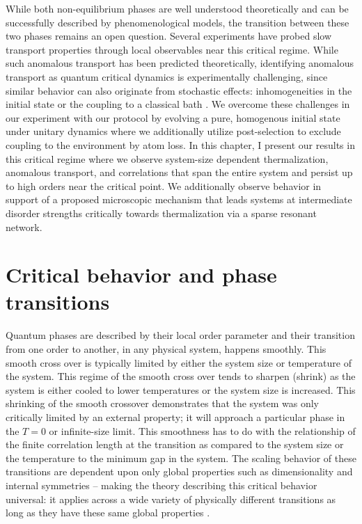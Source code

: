 While both non-equilibrium phases are well understood theoretically and can be successfully described by phenomenological models\cite{Serbyn2013b,Huse2014,Nandkishore2015}, the transition between these two phases remains an open question\cite{Grover2014,Vosk2015,Potter2015,Khemani2017,Alet2018,Abanin2018,Zhang2018}. Several experiments have probed slow transport properties through local observables near this critical regime\cite{Luschen2017,Bordia2017}. While such anomalous transport has been predicted theoretically\cite{Agarwal2015,Setiawan2017,Zhang2018}, identifying anomalous transport as quantum critical dynamics is experimentally challenging, since similar behavior can also originate from stochastic effects: inhomogeneities in the initial state\cite{Luitz2016} or the coupling to a classical bath \cite{Nandkishore2014,Luschen2017b}. We overcome these challenges in our experiment with our protocol by evolving a pure, homogenous initial state under unitary dynamics where we additionally utilize post-selection to exclude coupling to the environment by atom loss\cite{Luschen2017b,Lukin2019}. In this chapter, I present our results in this critical regime where we observe system-size dependent thermalization, anomalous transport, and correlations that span the entire system and persist up to high orders near the critical point\cite{Rispoli2018}. We additionally observe behavior in support of a proposed microscopic mechanism that leads systems at intermediate disorder strengths critically towards thermalization via a sparse resonant network\cite{Potter2015,Khemani2017,Rispoli2018,Herviou2019}. 


\section{Critical behavior and phase transitions}

Quantum phases are described by their local order parameter and their transition from one order to another, in any physical system, happens smoothly. This smooth cross over is typically limited by either the system size or temperature of the system. This regime of the smooth cross over tends to sharpen (shrink) as the system is either cooled to lower temperatures or the system size is increased. This shrinking of the smooth crossover demonstrates that the system was only critically limited by an external property; it will approach a particular phase in the $T=0$ or infinite-size limit. This smoothness has to do with the relationship of the finite correlation length at the transition as compared to the system size or the temperature to the minimum gap in the system. The scaling behavior of these transitions are dependent upon only global properties such as dimensionality and internal symmetries -- making the theory describing this critical behavior universal: it applies across a wide variety of physically different transitions as long as they have these same global properties \cite{Sachdev2011}. 

